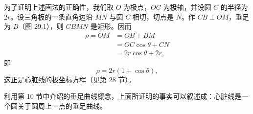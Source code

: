为了证明上述画法的正确性，我们取 $O$ 为极点，$OC$ 为极轴，并设圆 $C$ 的半径为 $2r$。设三角板的一条直角边沿 $MN$ 与圆 $C$ 相切，切点是 $N$。作 $CB\perp OM$，垂足为 $B$（图 29.1），则 $CBMN$ 是矩形。因而
\begin{align*}
  \rho = OM &= OB + BM \\
            &= OC\cos\theta + CN \\
            &= 2r\cos\theta + 2r,
\end{align*}
即
\[
  \rho = 2r(1+\cos\theta),
\]
这正是心脏线的极坐标方程（见第 28 节）。

利用第 10 节中介绍的垂足曲线概念，上面所证明的事实可以叙述成：心脏线是一个圆关于圆周上一点的垂足曲线。
